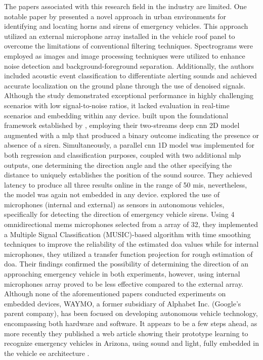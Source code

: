The papers associated with this research field in the industry are limited. One notable paper by \textcite{Marchegiani2022} presented a novel approach in urban environments for identifying and locating horns and sirens of emergency vehicles. This approach utilized an external microphone array installed in the vehicle roof panel to overcome the limitations of conventional filtering techniques. Spectrograms were employed as images and image processing techniques were utilized to enhance noise detection and background-foreground separation. Additionally, the authors included acoustic event classification to differentiate alerting sounds and achieved accurate localization on the ground plane through the use of denoised signals. Although the study demonstrated exceptional performance in highly challenging scenarios with low signal-to-noise ratios, it lacked evaluation in real-time scenarios and embedding within any device. \textcite{Sun2021} built upon the foundational framework established by \textcite{Tran2020}, employing their two-streams deep \gls{cnn} 2D model augmented with a \gls{mlp} that produced a binary outcome indicating the presence or absence of a siren. Simultaneously, a parallel \gls{cnn} 1D model was implemented for both regression and classification purposes, coupled with two additional \gls{mlp} outputs, one determining the direction angle and the other specifying the distance to uniquely establishes the position of the sound source. They achieved latency to produce all three results online in the range of 50 \gls{mi}\gls{s}, nevertheless, the model was again not embedded in any device. \textcite{Shabtai2019} explored the use of microphones (internal and external) as sensors in autonomous vehicles, specifically for detecting the direction of emergency vehicle sirens. Using 4 omnidirectional \gls{mems} microphones selected from a array of 32, they implemented a Multiple Signal Classification (MUSIC)-based algorithm with time smoothing techniques to improve the reliability of the estimated \gls{doa} values while for internal microphones, they utilized a transfer function projection for rough estimation of \gls{doa}. Their findings confirmed the possibility of determining the direction of an approaching emergency vehicle in both experiments, however, using internal microphones array proved to be less effective compared to the external array. Although none of the aforementioned papers conducted experiments on embedded devices, WAYMO, a former subsidiary of Alphabet Inc. (Google's parent company), has been focused on developing autonomous vehicle technology, encompassing both hardware and software. It appears to be a few steps ahead, as more recently they published a web article showing their prototype learning to recognize emergency vehicles in Arizona, using sound and light, fully embedded in the vehicle \gls{ee} architecture \cite{WAYMO2023}. 

